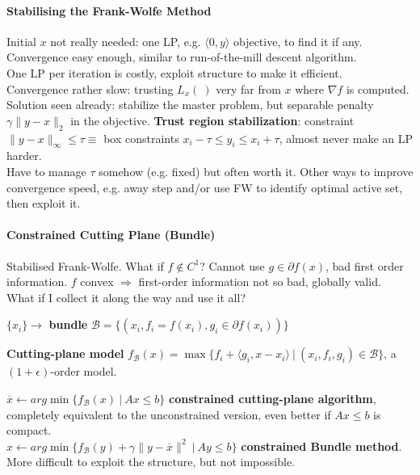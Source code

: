 \documentclass[10pt]{report}
\begin{document}
\paragraph{Stabilising the Frank-Wolfe Method} Initial $x$ not really needed: one LP, e.g. $\langle 0,y\rangle$ objective, to find it if any.\\
Convergence easy enough, similar to run-of-the-mill descent algorithm.\\
One LP per iteration is costly, exploit structure to make it efficient.\\
Convergence rather slow: trusting $L_x(\:)$ very far from $x$ where $\nabla f$ is computed.\\
Solution seen already: stabilize the master problem, but separable penalty $\gamma\|y-x\|_2$ in the objective. \textbf{Trust region stabilization}: constraint $\|y-x\|_\infty \leq \tau\equiv$ box constraints $x_i-\tau\leq y_i\leq x_i+\tau$, almost never make an LP harder.\\
Have to manage $\tau$ somehow (e.g. fixed) but often worth it. Other ways to improve convergence speed, e.g. away step and/or use FW to identify optimal active set, then exploit it.
\paragraph{Constrained Cutting Plane (Bundle)} Stabilised Frank-Wolfe. What if $f\not\in C^1$? Cannot use $g\in\partial f(x)$, bad first order information. $f$ convex $\Rightarrow$ first-order information not so bad, globally valid.\\
What if I collect it along the way and use it all?
\begin{list}{}{}
	\item $\{x_i\}\rightarrow$ \textbf{bundle} $\mathscr{B}=\{(x_i, f_i = f(x_i), g_i\in\partial f(x_i))\}$
	\item \textbf{Cutting-plane model} $f_\mathscr{B}(x) = \max\{f_i+\langle g_i, x-x_i\rangle\:|\:(x_i, f_i, g_i)\in \mathscr{B}\}$, a $(1+\epsilon)$-order model.
\end{list}
$\overline{x}\leftarrow arg\min\{f_\mathscr{B}(x)\:|\:Ax\leq b\}$ \textbf{constrained cutting-plane algorithm}, completely equivalent to the unconstrained version, even better if $Ax\leq b$ is compact.\\
$x\leftarrow arg\min\{f_\mathscr{B}(y)+\gamma\|y-\overline{x}\|^2\:|\:Ay\leq b\}$ \textbf{constrained Bundle method}.\\
More difficult to exploit the structure, but not impossible.
\end{document}
